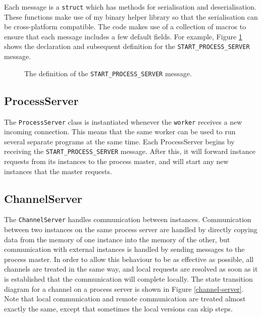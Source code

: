 Each message is a \texttt{struct} which has methods for serialisation and
deserialisation. These functions make use of my binary helper library so that
the serialisation can be cross-platform compatible. The code makes use of
a collection of macros to ensure that each message includes a few default
fields. For example, Figure \ref{start-process-server} shows the declaration and
subsequent definition for the \texttt{START\_PROCESS\_SERVER} message.

\begin{figure}[h]
  
  \caption{The definition of the \texttt{START\_PROCESS\_SERVER} message.}
  \label{start-process-server}
\end{figure}

\subsection{ProcessServer}

The \texttt{ProcessServer} class is instantiated whenever the \texttt{worker}
receives a new incoming connection. This means that the same worker can be used
to run several separate programs at the same time. Each ProcessServer begins by
receiving the \texttt{START\_PROCESS\_SERVER} message. After this, it will
forward instance requests from its instances to the process master, and will
start any new instances that the master requests.

\subsection{ChannelServer}

The \texttt{ChannelServer} handles communication between instances.
Communication between two instances on the same process server are handled
by directly copying data from the memory of one instance into the memory of the
other, but communication with external instances is handled by sending messages
to the process master. In order to allow this behaviour to be as effective as
possible, all channels are treated in the same way, and local requests are
resolved as soon as it is established that the communication will complete
locally. The state transition diagram for a channel on a process server is shown
in Figure \ref{channel-server}. Note that local communication and remote
communication are treated almost exactly the same, except that sometimes the
local versions can skip steps.

